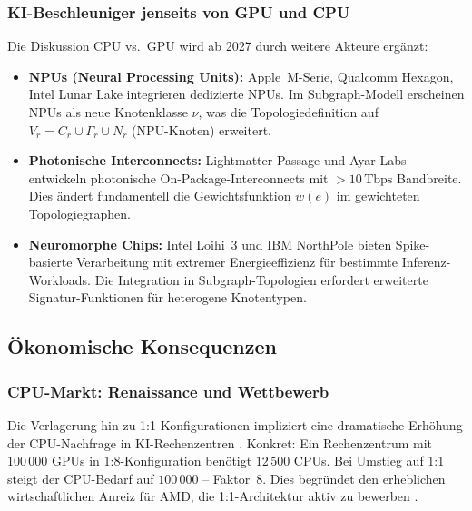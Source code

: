 ﻿\documentclass[a4paper,12pt]{article}
\theoremstyle{definition}
\begin{document}
\subsubsection{KI-Beschleuniger jenseits von GPU und CPU}

Die Diskussion CPU vs.\ GPU wird ab 2027 durch weitere Akteure erg\"anzt:
\begin{itemize}
  \item \textbf{NPUs (Neural Processing Units):} Apple~M-Serie, Qualcomm
        Hexagon, Intel Lunar Lake integrieren dedizierte NPUs. Im Subgraph-Modell
        erscheinen NPUs als neue Knotenklasse $\nu$, was die Topologiedefinition
        auf $V_r = C_r \cup \Gamma_r \cup N_r$ (NPU-Knoten) erweitert.
  \item \textbf{Photonische Interconnects:} Lightmatter Passage und Ayar Labs
        entwickeln photonische On-Package-Interconnects mit $>10\,\text{Tbps}$
        Bandbreite. Dies \"andert fundamentell die Gewichtsfunktion $w(e)$ im
        gewichteten Topologiegraphen.
  \item \textbf{Neuromorphe Chips:} Intel Loihi~3 und IBM NorthPole bieten
        Spike-basierte Verarbeitung mit extremer Energieeffizienz f\"ur
        bestimmte Inferenz-Workloads. Die Integration in Subgraph-Topologien
        erfordert erweiterte Signatur-Funktionen f\"ur heterogene Knotentypen.
\end{itemize}

\subsection{\"Okonomische Konsequenzen}

\subsubsection{CPU-Markt: Renaissance und Wettbewerb}

Die Verlagerung hin zu 1:1-Konfigurationen impliziert eine dramatische
Erh\"ohung der CPU-Nachfrage in KI-Rechenzentren \cite{computerbase2026}.
Konkret: Ein Rechenzentrum mit $100\,000$ GPUs in 1:8-Konfiguration
ben\"otigt $12\,500$ CPUs. Bei Umstieg auf 1:1 steigt der CPU-Bedarf
auf $100\,000$ -- Faktor~8. Dies begr\"undet den erheblichen wirtschaftlichen
Anreiz f\"ur AMD, die 1:1-Architektur aktiv zu bewerben \cite{computerbase2026}.
\end{document}
